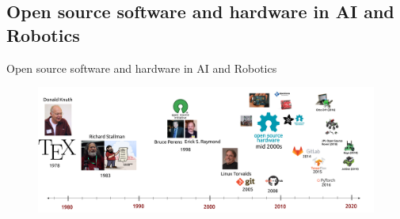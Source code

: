 \subsection{Open source software and hardware in AI and Robotics}

{
\begin{frame}{Open source software and hardware in AI and Robotics}

      \begin{figure}
        \centering
        \includegraphics[width=1.0\textwidth]{./figures/timeline-osh/outputs/drawing-v00.png}
      \end{figure}
\end{frame}
}

